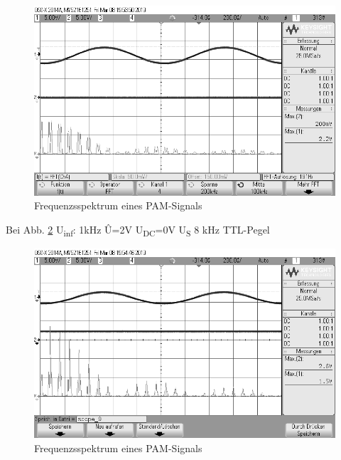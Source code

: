 \documentclass[12pt,a4paper]{scrartcl}
\begin{document}
  \begin{figure}[htbp]
    \begin{minipage}{0.8\textwidth}
     \centering
      \includegraphics[width=1\textwidth]{scope_8}
      \caption{Frequenzsspektrum eines PAM-Signals}
      \label{fig:scope_8}
    \end{minipage}\hfill
  \end{figure}
  
  \newpage
  Bei Abb. \ref{fig:scope_9} U\textsubscript{inf}:  1kHz \^{U}=2V
        U\textsubscript{DC}=0V
        U\textsubscript{S} 8 kHz TTL-Pegel
        
  \begin{figure}[htbp]
    \begin{minipage}{0.72\textwidth}
     \centering
      \includegraphics[width=1\textwidth]{scope_9}
      \caption{Frequenzsspektrum eines PAM-Signals}
      \label{fig:scope_9}
    \end{minipage}\hfill
  \end{figure}
  
\end{document}
